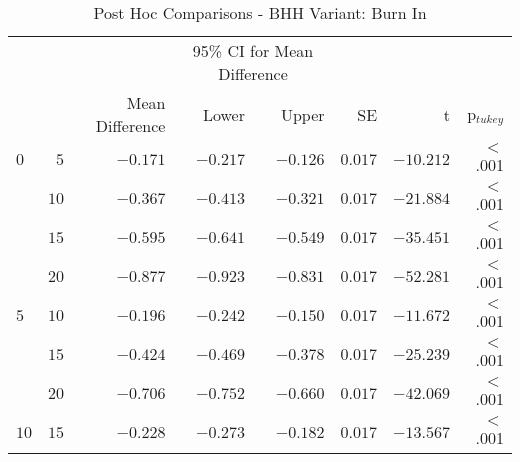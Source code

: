 \begin{table}[H]
	\centering
	\caption{Post Hoc Comparisons - BHH Variant: Burn In}
	\label{tab:results:burn_in:post_hoc}%
	\par\bigskip
	\resizebox{0.95\textwidth}{!}
	{
		\begin{tabular}{lrrrrrrr}
			\toprule
			\multicolumn{1}{c}{} & \multicolumn{1}{c}{} & \multicolumn{1}{c}{} & \multicolumn{2}{c}{95\% CI for Mean Difference} & \multicolumn{1}{c}{} & \multicolumn{1}{c}{} & \multicolumn{1}{c}{}               \\
			\cline{4-5}
			$ $                  & $ $                  & Mean Difference      & Lower                                           & Upper                & SE                   & t                    & p$_{tukey}$ \\
			\cmidrule[0.4pt]{1-8}
			$0$                  & $5$                  & $-0.171$             & $-0.217$                                        & $-0.126$             & $0.017$              & $-10.212$            & $<$ .001    \\
			$ $                  & $10$                 & $-0.367$             & $-0.413$                                        & $-0.321$             & $0.017$              & $-21.884$            & $<$ .001    \\
			                     & $15$                 & $-0.595$             & $-0.641$                                        & $-0.549$             & $0.017$              & $-35.451$            & $<$ .001    \\
			                     & $20$                 & $-0.877$             & $-0.923$                                        & $-0.831$             & $0.017$              & $-52.281$            & $<$ .001    \\
			$5$                  & $10$                 & $-0.196$             & $-0.242$                                        & $-0.150$             & $0.017$              & $-11.672$            & $<$ .001    \\
			$ $                  & $15$                 & $-0.424$             & $-0.469$                                        & $-0.378$             & $0.017$              & $-25.239$            & $<$ .001    \\
			                     & $20$                 & $-0.706$             & $-0.752$                                        & $-0.660$             & $0.017$              & $-42.069$            & $<$ .001    \\
			$10$                 & $15$                 & $-0.228$             & $-0.273$                                        & $-0.182$             & $0.017$              & $-13.567$            & $<$ .001    \\

\end{tabular}}
\end{table}
